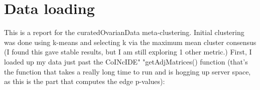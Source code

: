 \documentclass{article}
\author{Your name}
\begin{document}


\maketitle
\tableofcontents
\newpage
\section{Data loading}
This is a report for the curatedOvarianData meta-clustering. Initial clustering was done using k-means and selecting k via the maximum mean cluster consensus (I found this gave stable results, but I am still exploring 1 other metric.) First, I loaded up my data just past the CoINcIDE" "getAdjMatrices() function (that's the function that takes  a really long time to run and is hogging up server space, as this is the part that computes the edge p-values):
\end{document}
